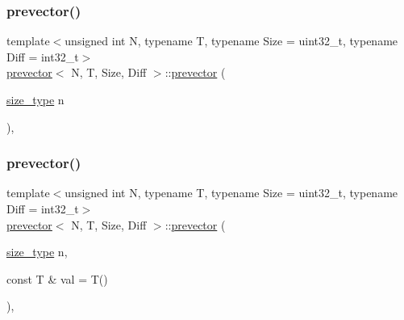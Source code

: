 \subsubsection{\texorpdfstring{prevector()}{prevector()}\hspace{0.1cm}{\footnotesize\ttfamily [2/5]}}
{\footnotesize\ttfamily template$<$unsigned int N, typename T, typename Size = uint32\+\_\+t, typename Diff = int32\+\_\+t$>$ \\
\mbox{\hyperlink{classprevector}{prevector}}$<$ N, T, Size, Diff $>$\+::\mbox{\hyperlink{classprevector}{prevector}} (\begin{DoxyParamCaption}\item[{\mbox{\hyperlink{classprevector_a7e0da95e6d1c878f6eeb572f4fc12524}{size\+\_\+type}}}]{n }\end{DoxyParamCaption})\hspace{0.3cm}{\ttfamily [inline]}, {\ttfamily [explicit]}}

\mbox{\label{classprevector_a044c7d0d417476bb08cc8c9b33755cac}} 
\subsubsection{\texorpdfstring{prevector()}{prevector()}\hspace{0.1cm}{\footnotesize\ttfamily [3/5]}}
{\footnotesize\ttfamily template$<$unsigned int N, typename T, typename Size = uint32\+\_\+t, typename Diff = int32\+\_\+t$>$ \\
\mbox{\hyperlink{classprevector}{prevector}}$<$ N, T, Size, Diff $>$\+::\mbox{\hyperlink{classprevector}{prevector}} (\begin{DoxyParamCaption}\item[{\mbox{\hyperlink{classprevector_a7e0da95e6d1c878f6eeb572f4fc12524}{size\+\_\+type}}}]{n,  }\item[{const T \&}]{val = {\ttfamily T()} }\end{DoxyParamCaption})\hspace{0.3cm}{\ttfamily [inline]}, {\ttfamily [explicit]}}

\mbox{\label{classprevector_a1f97e987163b5d6525168ed8e4229fe9}} 
